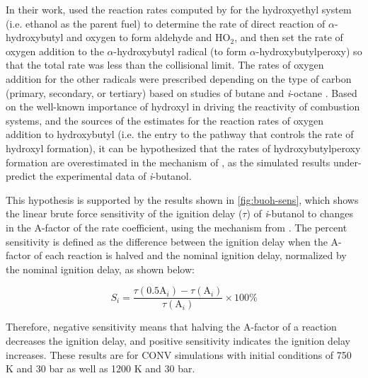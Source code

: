 \documentclass[12pt, letterpaper]{article}
\begin{document}
In their work, \textcite{Sarathy2012} used the reaction rates computed by
\textcite{DaSilva2009} for the hydroxyethyl system (i.e. ethanol as the parent
fuel) to determine the rate of direct reaction of $\alpha$-hydroxybutyl and
oxygen to form aldehyde and HO$_2$, and then set the rate of oxygen addition to
the $\alpha$-hydroxybutyl radical (to form $\alpha$-hydroxybutylperoxy) so that
the total rate was less than the collisional limit. The rates of oxygen
addition for the other radicals were prescribed depending on the type of carbon
(primary, secondary, or tertiary) based on studies of butane and
\textit{i}-octane \cite{Sarathy2012}. Based on the well-known importance of
hydroxyl in driving the reactivity of combustion systems, and the sources of
the estimates for the reaction rates of oxygen addition to hydroxybutyl (i.e.
the entry to the pathway that controls the rate of hydroxyl formation), it can
be hypothesized that the rates of hydroxybutylperoxy formation are
overestimated in the mechanism of \textcite{Sarathy2012}, as the simulated
results under-predict the experimental data of \textit{i}-butanol.

This hypothesis is supported by the results shown in \autoref{fig:buoh-sens},
which shows the linear brute force sensitivity of the ignition delay ($\tau$)
of \textit{i}-butanol to changes in the A-factor of the rate coefficient, using
the mechanism from \textcite{Sarathy2012}. The percent sensitivity is defined
as the difference between the ignition delay when the A-factor of each reaction
is halved and the nominal ignition delay, normalized by the nominal ignition
delay, as shown below:

\begin{equation}
    \label{eq:buoh-sens}
    S_i=\frac{\tau(0.5\mathrm{A}_i )-\tau(\mathrm{A}_i )}{\tau(\mathrm{A}_i)} \times 100\%
\end{equation}

Therefore, negative sensitivity means that halving the A-factor of a reaction
decreases the ignition delay, and positive sensitivity indicates the ignition
delay increases. These results are for CONV simulations with initial conditions
of 750 K and 30 bar as well as 1200 K and 30 bar.
\end{document}
